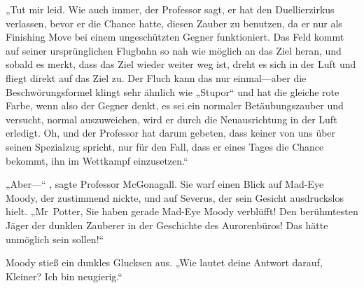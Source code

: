 „Tut mir leid. Wie auch immer, der Professor sagt, er hat den Duellierzirkus verlassen, bevor er die Chance hatte, diesen Zauber zu benutzen, da er nur als Finishing Move bei einem ungeschützten Gegner funktioniert. Das Feld kommt auf seiner ursprünglichen Flugbahn so nah wie möglich an das Ziel heran, und sobald es merkt, dass das Ziel wieder weiter weg ist, dreht es sich in der Luft und fliegt direkt auf das Ziel zu. Der Fluch kann das nur einmal—aber die Beschwörungsformel klingt sehr ähnlich wie „Stupor“ und hat die gleiche rote Farbe, wenn also der Gegner denkt, es sei ein normaler Betäubungszauber und versucht, normal auszuweichen, wird er durch die Neuausrichtung in der Luft erledigt. Oh, und der Professor hat darum gebeten, dass keiner von uns über seinen Spezialzug spricht, nur für den Fall, dass er eines Tages die Chance bekommt, ihn im Wettkampf einzusetzen.“

„Aber—“ , sagte Professor McGonagall. Sie warf einen Blick auf Mad-Eye Moody, der zustimmend nickte, und auf Severus, der sein Gesicht ausdruckslos hielt. „Mr~Potter, Sie haben gerade Mad-Eye Moody verblüfft! Den berühmtesten Jäger der dunklen Zauberer in der Geschichte des Aurorenbüros! Das hätte unmöglich sein sollen!“

Moody stieß ein dunkles Glucksen aus. „Wie lautet deine Antwort darauf, Kleiner? Ich bin neugierig.“

